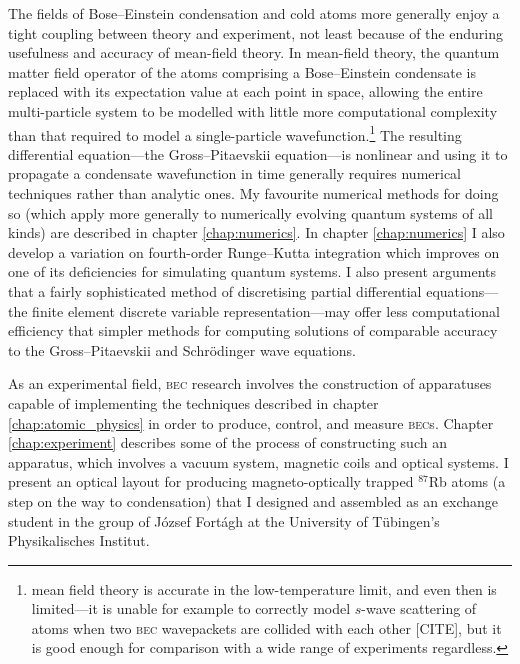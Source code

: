 The fields of Bose--Einstein condensation and cold atoms more generally enjoy a tight coupling between theory and experiment, not least because of the enduring usefulness and accuracy of mean-field theory. In mean-field theory, the quantum matter field operator of the atoms comprising a Bose--Einstein condensate is replaced with its expectation value at each point in space, allowing the entire multi-particle system to be modelled with little more computational complexity than that required to model a single-particle wavefunction.\footnote{mean field theory is accurate in the low-temperature limit, and even then is limited---it is unable for example to correctly model $s$-wave scattering of atoms when two \textsc{bec} wavepackets are collided with each other [CITE], but it is good enough for comparison with a wide range of experiments regardless.} The resulting differential equation---the Gross--Pitaevskii equation---is nonlinear and using it to propagate a condensate wavefunction in time generally requires numerical techniques rather than analytic ones. My favourite numerical methods for doing so (which apply more generally to numerically evolving quantum systems of all kinds) are described in chapter \ref{chap:numerics}. In chapter \ref{chap:numerics} I also develop a variation on fourth-order Runge--Kutta integration which improves on one of its deficiencies for simulating quantum systems. I also present arguments that a fairly sophisticated method of discretising partial differential equations---the finite element discrete variable representation---may offer less computational efficiency that simpler methods for computing solutions of comparable accuracy to the Gross--Pitaevskii and Schr\"odinger wave equations.

As an experimental field, \textsc{bec} research involves the construction of apparatuses capable of implementing the techniques described in chapter \ref{chap:atomic_physics} in order to produce, control, and measure \textsc{bec}s. Chapter \ref{chap:experiment} describes some of the process of constructing such an apparatus, which involves a vacuum system, magnetic coils and optical systems. I present an optical layout for producing magneto-optically trapped $^{87}$Rb atoms (a step on the way to condensation) that I designed and assembled as an exchange student in the group of József Fortágh at the University of T\"ubingen's Physikalisches Institut.

